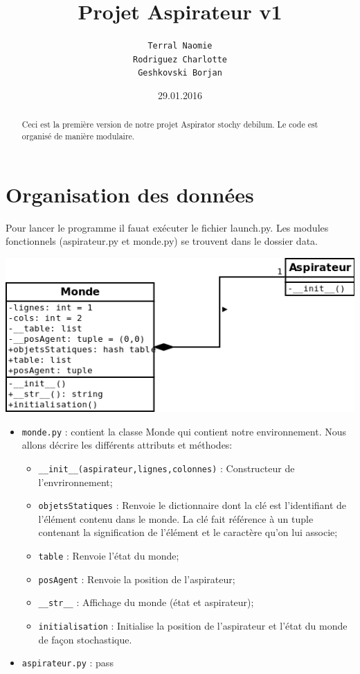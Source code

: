 \documentclass[a4paper,10pt]{article}
\title{Projet Aspirateur v1}
\author{\texttt{Terral Naomie}\\
		\texttt{Rodriguez Charlotte}\\
		\texttt{Geshkovski Borjan}
		}
\date{29.01.2016}
\begin{document}
\maketitle

\begin{abstract}
Ceci est la première version de notre projet Aspirator stochy debilum. Le code est organisé de manière modulaire. 
\end{abstract}

\section*{Organisation des données}
Pour lancer le programme il fauat exécuter le fichier launch.py. Les modules fonctionnels (aspirateur.py et monde.py) se trouvent dans le dossier data.\\ 

\begin{center}
\includegraphics[scale=0.5]{architecture}
\end{center}


\begin{itemize}
 \item \texttt{monde.py} : contient la classe Monde qui contient notre environnement. Nous allons décrire les différents attributs et méthodes:
  \begin{itemize}
  \item \texttt{\_\_init\_\_(aspirateur,lignes,colonnes)} : Constructeur de l'envrironnement;
  \item \texttt{objetsStatiques} : Renvoie le dictionnaire dont la clé est l'identifiant de l'élément contenu dans le monde. La clé fait référence à un tuple contenant la signification de l'élément et le caractère qu'on lui associe;
  \item \texttt{table} : Renvoie l'état du monde;
  \item \texttt{posAgent} : Renvoie la position de l'aspirateur;
  \item \texttt{\_\_str\_\_} : Affichage du monde (état et aspirateur);
  \item \texttt{initialisation} : Initialise la position de l'aspirateur et l'état du monde de façon stochastique.
  \end{itemize}
 \item \texttt{aspirateur.py} : pass
\end{itemize}
\end{document}
